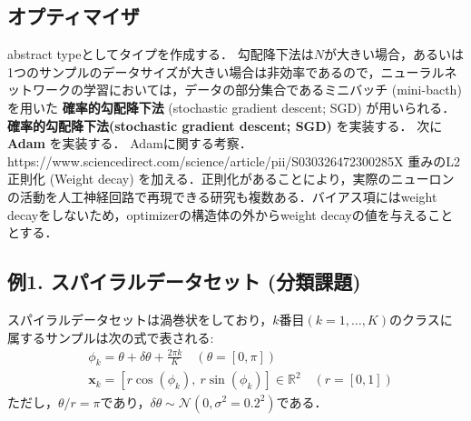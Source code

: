\subsection{オプティマイザ}
abstract typeとしてタイプを作成する．
勾配降下法は$N$が大きい場合，あるいは1つのサンプルのデータサイズが大きい場合は非効率であるので，ニューラルネットワークの学習においては，データの部分集合であるミニバッチ (mini-bacth) を用いた \textbf{確率的勾配降下法} (stochastic gradient descent; SGD) が用いられる．
\textbf{確率的勾配降下法(stochastic gradient descent; SGD)} を実装する．
次に\textbf{Adam} \citep{Kingma2014-fm} を実装する．
Adamに関する考察．
https://www.sciencedirect.com/science/article/pii/S030326472300285X
重みのL2正則化 (Weight decay) を加える．正則化があることにより，実際のニューロンの活動を人工神経回路で再現できる研究も複数ある．バイアス項にはweight decayをしないため，optimizerの構造体の外からweight decayの値を与えることとする．
\subsection{例1. スパイラルデータセット (分類課題)}
スパイラルデータセットは渦巻状をしており，$k$番目$(k=1, \ldots, K)$のクラスに属するサンプルは次の式で表される:
\begin{align}
&\phi_k = \theta+\delta\theta+\frac{2\pi k}{K}\quad (\theta=[0, \pi])\ \\
&\mathbf{x}_k=[r\cos(\phi_k),\ r\sin(\phi_k)]\in \mathbb{R}^2\quad (r=[0, 1])
\end{align}
ただし，$\theta/r=\pi$であり，$\delta\theta \sim \mathcal{N}(0, \sigma^2=0.2^2)$である．
